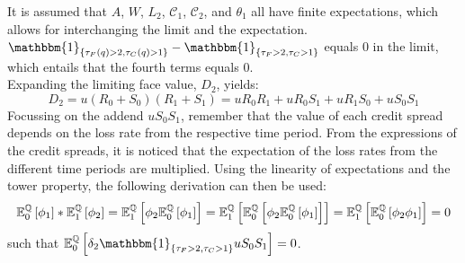 \documentclass[main.tex]{subfiles}
\begin{document}
        It is assumed that $A$, $W$, $L_{2}$, $\mathcal{C}_1$, $\mathcal{C}_2$, and $\theta_1$ all have finite expectations,
        which allows for interchanging the limit and the expectation.
        $\mathbbm{1}_{\{\tau_{F}(q)>2,\tau_{C}(q)>1\}} - \mathbbm{1}_{\{\tau_{F}>2,\tau_{C}>1\}}$ equals 0 in the limit,
        which entails that the fourth terms equals 0.
        \\
        Expanding the limiting face value, $D_{2}$, yields:
        \begin{equation}
            D_2 = u(R_0 + S_0)(R_1 + S_1) = u R_0 R_1 + u R_0 S_1 + u R_1 S_0 + u S_0 S_1
        \end{equation}
        Focussing on the addend $u S_0 S_1$, remember that the value of each credit spread depends on the loss rate from the respective time period.
        From the expressions of the credit spreads, it is noticed that the expectation of the loss rates from the different time periods are multiplied.
        Using the linearity of expectations and the tower property, the following derivation can then be used:
        \begin{equation*}
            \mathbb{E}_{0}^{\mathbb{Q}}\left[\phi_1\right]
            * \mathbb{E}_{1}^{\mathbb{Q}}\left[\phi_2\right]
            = \mathbb{E}_{1}^{\mathbb{Q}}\left[
                \phi_2 \mathbb{E}_{0}^{\mathbb{Q}}\left[\phi_1\right]
            \right] 
            = \mathbb{E}_{1}^{\mathbb{Q}}\left[
                \mathbb{E}_{0}^{\mathbb{Q}}\left[
                    \phi_2
                    \mathbb{E}_{0}^{\mathbb{Q}}\left[
                        \phi_1
                    \right]
                \right]
            \right]
            = \mathbb{E}_{1}^{\mathbb{Q}}\left[
                \mathbb{E}_{0}^{\mathbb{Q}}\left[
                    \phi_2 \phi_1
                \right]
            \right]
            = 0
        \end{equation*}
        such that $\mathbb{E}_{0}^{\rnmeasure}\left[\delta_2\mathbbm{1}_{\{\tau_{F}>2,\tau_{C}>1\}}u S_0 S_1\right] = 0$.
        
\end{document}
